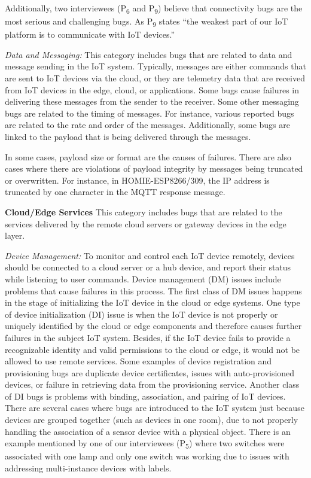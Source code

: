 Additionally, two interviewees (P\textsubscript{6} and P\textsubscript{9}) believe that connectivity bugs are the most serious and challenging bugs. As P\textsubscript{9} states \enquote{the weakest part of our IoT platform is to communicate with IoT devices.}

\textit{Data and Messaging:}
This category includes bugs that are related to data and message sending in the IoT system. Typically, messages are either commands that are sent to IoT devices via the cloud, or they are telemetry data that are received from IoT devices in the edge, cloud, or applications. Some bugs cause failures in delivering these messages from the sender to the receiver. Some other messaging bugs are related to the timing of messages. For instance, various reported bugs are related to the rate and order of the messages. Additionally, some bugs are linked to the payload that is being delivered through the messages. 

In some cases, payload size or format are the causes of failures. There are also cases where there are violations of payload integrity by messages being truncated or overwritten. For instance, in HOMIE-ESP8266/309, the IP address is truncated by one character in the MQTT response message.


\textbf{Cloud/Edge Services}
This category includes bugs that are related to the services delivered by the remote cloud servers or gateway devices in the edge layer. 

\textit{Device Management:}
To monitor and control each IoT device remotely, devices should be connected to a cloud server or a hub device, and report their status while listening to user commands. Device management (DM) issues include problems that cause failures in this process. 
The first class of DM issues happens in the stage of initializing the IoT device in the cloud or edge systems. One type of device initialization (DI) issue is when the IoT device is not properly or uniquely identified by the cloud or edge components and therefore causes further failures in the subject IoT system. Besides, if the IoT device fails to provide a recognizable identity and valid permissions to the cloud or edge, it would not be allowed to use remote services. Some examples of device registration and provisioning bugs are duplicate device certificates, issues with auto-provisioned devices, or failure in retrieving data from the provisioning service. Another class of DI bugs is problems with binding, association, and pairing of IoT devices. There are several cases where bugs are introduced to the IoT system just because devices are grouped together (such as devices in one room), due to not properly handling the association of a sensor device with a physical object. There is an example mentioned by one of our interviewees (P\textsubscript{5}) where two switches were associated with one lamp and only one switch was working due to issues with addressing multi-instance devices with labels.

